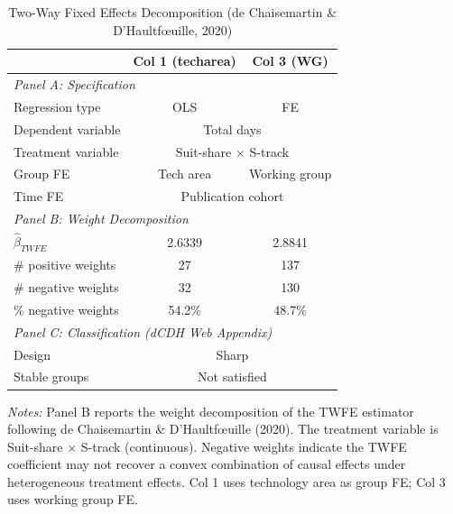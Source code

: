 \begin{table}[htbp]
\centering
\caption{Two-Way Fixed Effects Decomposition (de Chaisemartin \& D'Haultf\oe uille, 2020)}
\label{tab:simcoe_twfe}
\begin{tabular}{lcc}
\toprule
 & Col 1 (techarea) & Col 3 (WG) \\
\midrule
\multicolumn{3}{l}{\textit{Panel A: Specification}} \\[3pt]
Regression type & OLS & FE \\
Dependent variable & \multicolumn{2}{c}{Total days} \\
Treatment variable & \multicolumn{2}{c}{Suit-share $\times$ S-track} \\
Group FE & Tech area & Working group \\
Time FE  & \multicolumn{2}{c}{Publication cohort} \\[6pt]
\multicolumn{3}{l}{\textit{Panel B: Weight Decomposition}} \\[3pt]
$\hat{\beta}_{TWFE}$ &     2.6339 &     2.8841 \\
\# positive weights & 27 & 137 \\
\# negative weights & 32 & 130 \\
\% negative weights &  54.2\% &  48.7\% \\[6pt]
\multicolumn{3}{l}{\textit{Panel C: Classification (dCDH Web Appendix)}} \\[3pt]
Design & \multicolumn{2}{c}{Sharp} \\
Stable groups & \multicolumn{2}{c}{Not satisfied} \\
\bottomrule
\end{tabular}

\vspace{6pt}
\begin{minipage}{0.92\textwidth}
\footnotesize
\textit{Notes:} Panel B reports the weight decomposition of the TWFE estimator 
following de Chaisemartin \& D'Haultf\oe uille (2020). 
The treatment variable is Suit-share $\times$ S-track (continuous). 
Negative weights indicate the TWFE coefficient may not recover 
a convex combination of causal effects under heterogeneous treatment effects. 
Col 1 uses technology area as group FE; Col 3 uses working group FE.
\end{minipage}
\end{table}
